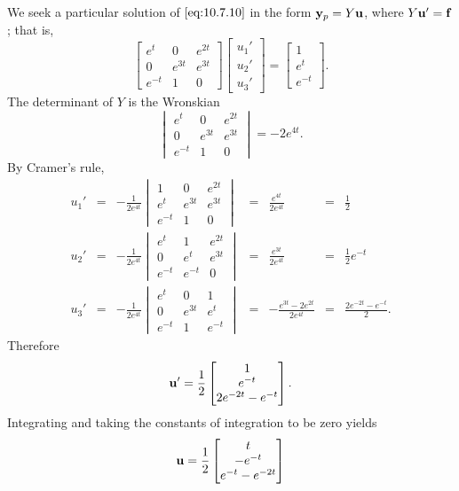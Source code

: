 \documentclass{ximera}
\begin{document}
\begin{example}
\begin{explanation}
We seek a particular solution of  $\eqref{eq:10.7.10}$ in the form
${\bf y}_p=Y{\bf u}$, where $Y{\bf u}'={\bf f}$; that is,
$$
\begin{bmatrix}e^t&0&e^{2t}\\0&e^{3t}&e^{3t}\\e^{-t}&1&0
\end{bmatrix}\begin{bmatrix}u_1'\\u_2'\\u_3'\end{bmatrix}=\begin{bmatrix}1\\e^t\\e^{-t}\end{bmatrix}.
$$
The determinant of $Y$  is the Wronskian
$$
\begin{vmatrix}e^t&0&e^{2t}\\0&e^{3t}&e^{3t}\\e^{-t}&1&0
\end{vmatrix}=-2e^{4t}.
$$
By Cramer's rule,
$$
\begin{array}{ccccccl}
u_1'&=&-\frac{1}{2e^{4t}}\begin{vmatrix}1&0&e^{2t}\\e^t&e^{3t}&e^{3t}
\\e^{-t}&1&0
\end{vmatrix}&=&\frac{e^{4t}}{2e^{4t}}&=&\frac{1}{2}
\\
u_2'&=&-\frac{1}{2e^{4t}}\begin{vmatrix}e^t&1&e^{2t}\\0&e^t&e^{3t}
\\e^{-t}&e^{-t}&0
\end{vmatrix}&=&\frac{e^{3t}}{2e^{4t}}&=&\frac{1}{2}e^{-t}\\
u_3'&=&-\frac{1}{2e^{4t}}\begin{vmatrix}e^t&0&1\\0&e^{3t}&e^t
\\e^{-t}&1&e^{-t}
\end{vmatrix}&=&-\frac{e^{3t}-2e^{2t}}{2e^{4t}}&=&\frac{2e^{-2t}-e^{-t}}{2}.
\end{array}
$$
Therefore
$$
{\bf
u}'=\frac{1}{2}\begin{bmatrix}1\\e^{-t}\\2e^{-2t}-e^{-t}\end{bmatrix}.
$$
Integrating  and taking the constants of integration to be zero yields
$$
{\bf u}=\frac{1}{2}\begin{bmatrix}t\\-e^{-t}\\e^{-t}-e^{-2t}

\end{bmatrix}$$
\end{explanation}
\end{example}
\end{document}
